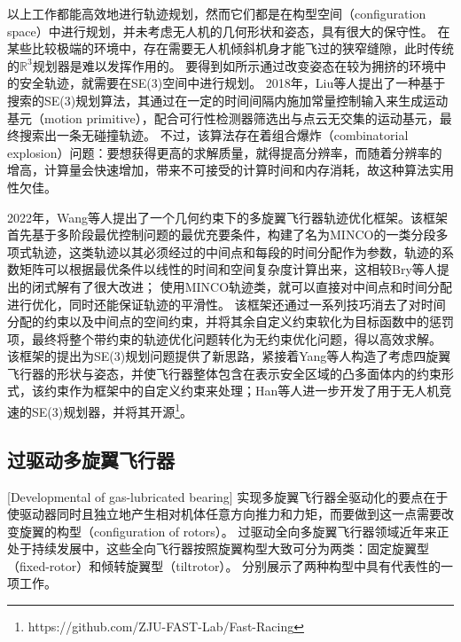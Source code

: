 以上工作都能高效地进行轨迹规划，然而它们都是在构型空间（configuration space）中进行规划，并未考虑无人机的几何形状和姿态，具有很大的保守性。
在某些比较极端的环境中，存在需要无人机倾斜机身才能飞过的狭窄缝隙，此时传统的$\mathbb{R}^3$规划器是难以发挥作用的。
要得到如所示通过改变姿态在较为拥挤的环境中的安全轨迹，就需要在SE(3)空间中进行规划。
2018年，Liu等人提出了一种基于搜索的SE(3)规划算法\cite{liu2018search}，其通过在一定的时间间隔内施加常量控制输入来生成运动基元（motion primitive），配合可行性检测器筛选出与点云无交集的运动基元，最终搜索出一条无碰撞轨迹。
不过，该算法存在着组合爆炸（combinatorial explosion）问题：要想获得更高的求解质量，就得提高分辨率，而随着分辨率的增高，计算量会快速增加，带来不可接受的计算时间和内存消耗，故这种算法实用性欠佳。

2022年，Wang等人提出了一个几何约束下的多旋翼飞行器轨迹优化框架\cite{wang2022geometrically}。该框架首先基于多阶段最优控制问题的最优充要条件，构建了名为MINCO的一类分段多项式轨迹，这类轨迹以其必须经过的中间点和每段的时间分配作为参数，轨迹的系数矩阵可以根据最优条件以线性的时间和空间复杂度计算出来，这相较Bry等人提出的闭式解\cite{bry2015aggressive}有了很大改进；
使用MINCO轨迹类，就可以直接对中间点和时间分配进行优化，同时还能保证轨迹的平滑性。
该框架还通过一系列技巧消去了对时间分配的约束以及中间点的空间约束，并将其余自定义约束软化为目标函数中的惩罚项，最终将整个带约束的轨迹优化问题转化为无约束优化问题，得以高效求解。
该框架的提出为SE(3)规划问题提供了新思路，紧接着Yang等人构造了考虑四旋翼飞行器的形状与姿态，并使飞行器整体包含在表示安全区域的凸多面体内的约束形式\cite{yang2021whole}，该约束作为框架中的自定义约束来处理；Han等人进一步开发了用于无人机竞速的SE(3)规划器\cite{2021Fast}，并将其开源\footnote{https://github.com/ZJU-FAST-Lab/Fast-Racing}。


\subsection{过驱动多旋翼飞行器}[Developmental of gas-lubricated bearing]
实现多旋翼飞行器全驱动化的要点在于使驱动器同时且独立地产生相对机体任意方向推力和力矩，而要做到这一点需要改变旋翼的构型（configuration of rotors）。
过驱动全向多旋翼飞行器领域近年来正处于持续发展中，这些全向飞行器按照旋翼构型大致可分为两类：固定旋翼型（fixed-rotor）\cite{brescianini2016design, park2018odar,allenspach2020design}和倾转旋翼型（tiltrotor）\cite{ryll2014novel, kamel2018voliro,2021Geometrically}。
分别展示了两种构型中具有代表性的一项工作。

